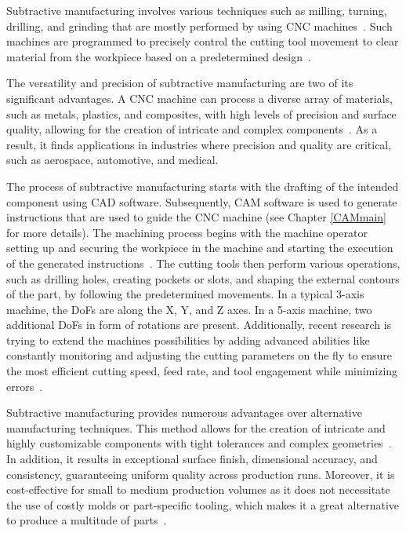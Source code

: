 Subtractive manufacturing involves various techniques such as milling, turning, drilling, and grinding that are mostly performed by using \acrshort{CNC} machines~\cite{Kumar.2020}. Such machines are programmed to precisely control the cutting tool movement to clear material from the workpiece based on a predetermined design~\cite{Amanullah.2017}.

The versatility and precision of subtractive manufacturing are two of its significant advantages. A \acrshort{CNC} machine can process a diverse array of materials, such as metals, plastics, and composites, with high levels of precision and surface quality, allowing for the creation of intricate and complex components~\cite{Tomaz.2021,Yang.2019}. As a result, it finds applications in industries where precision and quality are critical, such as aerospace, automotive, and medical.

The process of subtractive manufacturing starts with the drafting of the intended component using \acrshort{CAD} software. Subsequently, \acrshort{CAM} software is used to generate instructions that are used to guide the \acrshort{CNC} machine (see Chapter \ref{CAMmain} for more details). The machining process begins with the machine operator setting up and securing the workpiece in the machine and starting the execution of the generated instructions~\cite{Nee.2015}. The cutting tools then perform various operations, such as drilling holes, creating pockets or slots, and shaping the external contours of the part, by following the predetermined movements. In a typical 3-axis machine, the \acrshort{DoF}s are along the X, Y, and Z axes. In a 5-axis machine, two additional \acrshort{DoF}s in form of rotations are present. Additionally, recent research is trying to extend the machines possibilities by adding advanced abilities like constantly monitoring and adjusting the cutting parameters on the fly to ensure the most efficient cutting speed, feed rate, and tool engagement while minimizing errors~\cite{Tien.2021}.


Subtractive manufacturing provides numerous advantages over alternative manufacturing techniques. This method allows for the creation of intricate and highly customizable components with tight tolerances and complex geometries~\cite{Jayawardane.2023}. In addition, it results in exceptional surface finish, dimensional accuracy, and consistency, guaranteeing uniform quality across production runs. Moreover, it is cost-effective for small to medium production volumes as it does not necessitate the use of costly molds or part-specific tooling, which makes it a great alternative to produce a multitude of parts~\cite{Gu.2018}.

